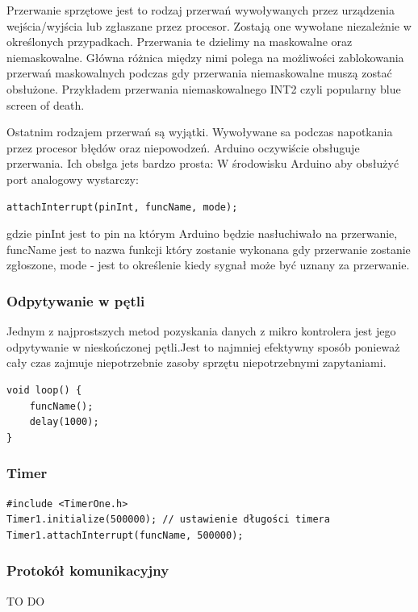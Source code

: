 \documentclass{xmgr}
\begin{document}
Przerwanie sprzętowe jest to rodzaj przerwań wywoływanych przez urządzenia wejścia/wyjścia lub zgłaszane przez procesor. Zostają one wywołane niezależnie w określonych przypadkach. Przerwania te dzielimy na maskowalne oraz niemaskowalne. Główna różnica między nimi polega na możliwości zablokowania przerwań maskowalnych podczas gdy przerwania niemaskowalne muszą zostać obsłużone. Przykładem przerwania niemaskowalnego INT2 czyli popularny blue screen of death.

Ostatnim rodzajem przerwań są wyjątki. Wywoływane sa podczas napotkania przez procesor błędów oraz niepowodzeń. Arduino oczywiście obsługuje przerwania. Ich obsłga jets bardzo prosta:
W środowisku Arduino aby obsłużyć port analogowy wystarczy:

\begin{lstlisting}[label=bot-dirs-alg,caption=Obsługa przerwań sprzętowych w środowisku Arduino]
attachInterrupt(pinInt, funcName, mode);
\end{lstlisting}
gdzie pinInt jest to pin na którym Arduino będzie nasłuchiwało na przerwanie, funcName jest to nazwa funkcji który zostanie wykonana gdy przerwanie zostanie zgłoszone, mode - jest to określenie kiedy sygnał może być uznany za przerwanie.

\subsubsection{Odpytywanie w pętli}
Jednym z najprostszych metod pozyskania danych z mikro kontrolera jest jego odpytywanie w nieskończonej pętli.Jest to najmniej efektywny sposób ponieważ cały czas zajmuje niepotrzebnie zasoby sprzętu niepotrzebnymi zapytaniami.

\begin{lstlisting}[label=bot-dirs-alg,caption=Odpytywanie w nieskończonej pętli w środowisku Arduino]
void loop() {
	funcName();
	delay(1000);
}
\end{lstlisting}

\subsubsection{Timer}
\begin{lstlisting}[label=bot-dirs-alg,caption=Użycie timer w środowisku Arduino]
#include <TimerOne.h>
Timer1.initialize(500000); // ustawienie długości timera
Timer1.attachInterrupt(funcName, 500000);
\end{lstlisting}
\subsubsection{Protokół komunikacyjny}
TO DO
\end{document}
